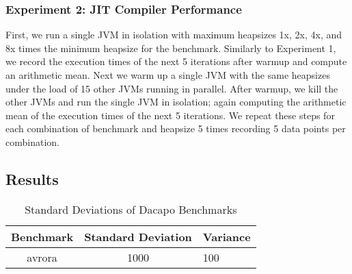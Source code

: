 \documentclass{sig-alternate}
\begin{document}
\subsubsection{Experiment 2: JIT Compiler Performance}
First, we run a single JVM in isolation with maximum heapsizes 1x, 2x, 4x, and 8x times the minimum heapsize for the benchmark. Similarly to Experiment 1, we record the execution times of the next 5 iterations after warmup and compute an arithmetic mean. Next we warm up a single JVM with the same heapsizes under the load of 15 other JVMs running in parallel. After warmup, we kill the other JVMs and run the single JVM in isolation; again computing the arithmetic mean of the execution times of the next 5 iterations. We repeat these steps for each combination of benchmark and heapsize 5 times recording 5 data points per combination.

\subsection{Results}

%
%
\begin{table}
\centering
\caption{Standard Deviations of Dacapo Benchmarks}
\begin{tabular}{|c|c|l|} \hline
Benchmark&Standard Deviation&Variance\\ \hline
avrora &1000&100\\
\hline\end{tabular}
\end{table}

\end{document}
